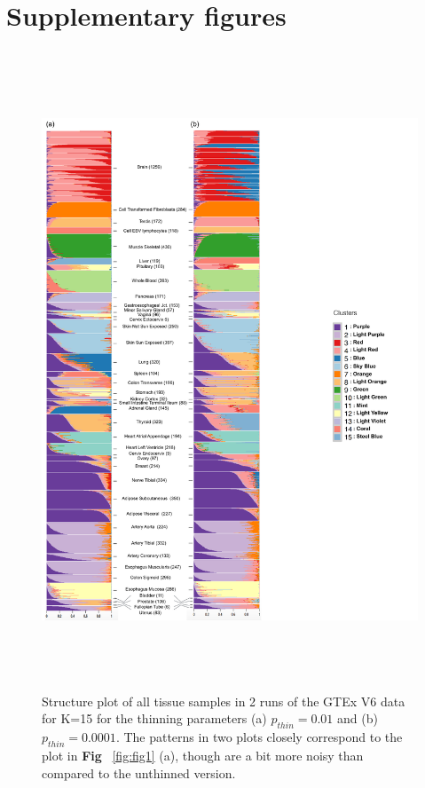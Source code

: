  \section{Supplementary figures}
 \begin{figure}[ht]
 \centering
\includegraphics[height=7.5in, width=6.5in]{../plots/gtex-figures/gtex2_02_29_16.pdf}
    \caption{Structure plot of all tissue samples in 2 runs of the GTEx V6 data for  K=15 for the thinning parameters (a) $p_{thin}=0.01$ and (b) $p_{thin}=0.0001$. The patterns in two plots closely correspond to the plot in \textbf{Fig} ~\ref{fig:fig1} (a), though are a bit more noisy than compared to the unthinned version. }
 \label{fig:figS1}
    \end{figure}

